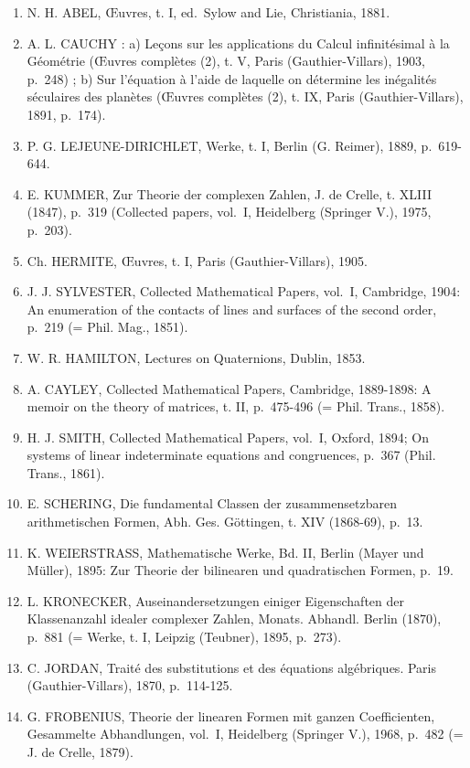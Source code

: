 \begin{enumerate}
\def\labelenumi{(\Roman{enumi})}
\setcounter{enumi}{8}
\item
  N. H. ABEL, Œuvres, t. I, ed.~Sylow and Lie, Christiania, 1881.
\item
  A. L. CAUCHY : a) Leçons sur les applications du Calcul infinitésimal à la Géométrie (Œuvres complètes (2), t. V, Paris (Gauthier-Villars), 1903, p.~248) ; b) Sur l'équation à l'aide de laquelle on détermine les inégalités séculaires des planètes (Œuvres complètes (2), t. IX, Paris (Gauthier-Villars), 1891, p.~174).
\item
  P. G. LEJEUNE-DIRICHLET, Werke, t. I, Berlin (G. Reimer), 1889, p.~619-644.
\item
  E. KUMMER, Zur Theorie der complexen Zahlen, J. de Crelle, t. XLIII (1847), p.~319 (Collected papers, vol.~I, Heidelberg (Springer V.), 1975, p.~203).
\item
  Ch. HERMITE, Œuvres, t. I, Paris (Gauthier-Villars), 1905.
\item
  J. J. SYLVESTER, Collected Mathematical Papers, vol.~I, Cambridge, 1904: An enumeration of the contacts of lines and surfaces of the second order, p.~219 (= Phil. Mag., 1851).
\item
  W. R. HAMILTON, Lectures on Quaternions, Dublin, 1853.
\item
  A. CAYLEY, Collected Mathematical Papers, Cambridge, 1889-1898: A memoir on the theory of matrices, t. II, p.~475-496 (= Phil. Trans., 1858).
\item
  H. J. SMITH, Collected Mathematical Papers, vol.~I, Oxford, 1894; On systems of linear indeterminate equations and congruences, p.~367 (Phil. Trans., 1861).
\item
  E. SCHERING, Die fundamental Classen der zusammensetzbaren arithmetischen Formen, Abh. Ges. Göttingen, t. XIV (1868-69), p.~13.
\item
  K. WEIERSTRASS, Mathematische Werke, Bd. II, Berlin (Mayer und Müller), 1895: Zur Theorie der bilinearen und quadratischen Formen, p.~19.
\item
  L. KRONECKER, Auseinandersetzungen einiger Eigenschaften der Klassenanzahl idealer complexer Zahlen, Monats. Abhandl. Berlin (1870), p.~881 (= Werke, t. I, Leipzig (Teubner), 1895, p.~273).
\item
  C. JORDAN, Traité des substitutions et des équations algébriques. Paris (Gauthier-Villars), 1870, p.~114-125.
\item
  G. FROBENIUS, Theorie der linearen Formen mit ganzen Coefficienten, Gesammelte Abhandlungen, vol.~I, Heidelberg (Springer V.), 1968, p.~482 (= J. de Crelle, 1879).

\end{enumerate}
